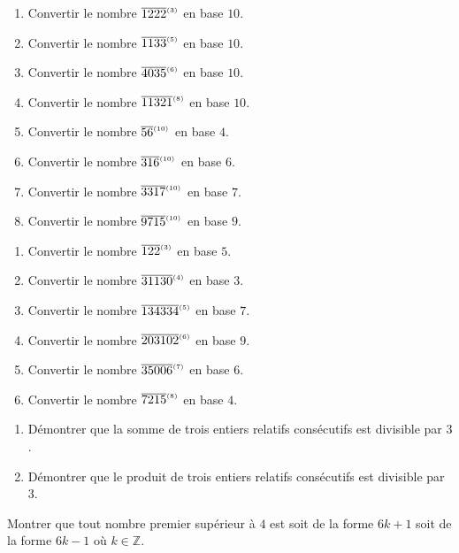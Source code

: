 \begin{exo}
	\begin{enumerate}
		\item Convertir le nombre $\overline{1222}^{_{(3)}}$ en base $ 10 $.
		\item Convertir le nombre $\overline{1133}^{_{(5)}}$ en base $ 10 $.
		\item Convertir le nombre $\overline{4035}^{_{(6)}}$ en base $ 10 $.
		\item Convertir le nombre $\overline{11321}^{_{(8)}}$ en base $ 10 $.
		\item Convertir le nombre $\overline{56}^{_{(10)}}$ en base $ 4 $.
		\item Convertir le nombre $\overline{316}^{_{(10)}}$ en base $ 6 $.
		\item Convertir le nombre $\overline{3317}^{_{(10)}}$ en base $ 7 $.
		\item Convertir le nombre $\overline{9715}^{_{(10)}}$ en base $ 9 $.
	\end{enumerate}
\end{exo}
%
\begin{exo}
	\begin{enumerate}
		\item Convertir le nombre $\overline{122}^{_{(3)}}$ en base $ 5 $.
		\item Convertir le nombre $\overline{31130}^{_{(4)}}$ en base $ 3 $.
		\item Convertir le nombre $\overline{134334}^{_{(5)}}$ en base $ 7 $.
		\item Convertir le nombre $\overline{203102}^{_{(6)}}$ en base $ 9 $.
		\item Convertir le nombre $\overline{35006}^{_{(7)}}$ en base $ 6 $.
		\item Convertir le nombre $\overline{7215}^{_{(8)}}$ en base $ 4 $.
	\end{enumerate}
\end{exo}
%
\begin{exo}
      \begin{enumerate}
            \item D\'emontrer que la somme de trois entiers relatifs cons\'ecutifs est divisible par $3$.
            \item D\'emontrer que le produit de trois entiers relatifs cons\'ecutifs est divisible par $3$.
      \end{enumerate}
\end{exo}
%
\begin{exo}
      Montrer que tout nombre premier sup\'erieur \`a $4$ est 
      soit de la forme $6 k + 1$ soit de la forme $6 k -1$ o\`u $k\in\mathbb{Z}$.
\end{exo}
